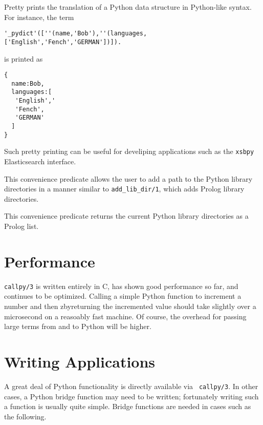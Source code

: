 \begin{description}

Pretty prints the translation of a Python data structure in
Python-like syntax.  For instance, the term

\begin{verbatim}
'_pydict'([''(name,'Bob'),''(languages,['English','Fench','GERMAN'])]).
\end{verbatim}

\noindent
is printed as 
\begin{verbatim}
{
  name:Bob,
  languages:[
   'English','
   'Fench',
   'GERMAN'
  ]
}
\end{verbatim}

Such pretty printing can be useful for develiping applications such as
the {\tt xsbpy} Elasticsearch interface.

%
This convenience predicate allows the user to add a path to the Python
library directories in a manner similar to {\tt add\_lib\_dir/1},
which adds Prolog library directories.  

%
This convenience predicate returns the current Python library
directories as a Prolog list.

\end{description}

\section{Performance}

{\tt callpy/3} is written entirely in C, has shown good performance so
far, and continues to be optimized.  Calling a simple Python function
to increment a number and then zbyreturning the incremented value should
take slightly over a microsecond on a reasoably fast machine.  Of
course, the overhead for passing large terms from and to Python will
be higher.

\section{Writing Applications}

A great deal of Python functionality is directly available via {\tt
  callpy/3}.  In other cases, a Python bridge function may need to be
written; fortunately writing such a function is usually quite
simple.  Bridge functions are needed in cases such as the following.

